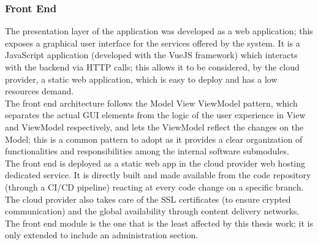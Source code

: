   \subsubsection{Front End}
  \label{ssse:originalfrontend}
    The presentation layer of the application was developed as a web application; this exposes a graphical user interface for the services offered by the system. It is a JavaScript application (developed with the VueJS framework) which interacts with the backend via HTTP calls; this allows it to be considered, by the cloud provider, a static web application, which is easy to deploy and has a low resources demand.\\
    The front end architecture follows the Model View ViewModel pattern, which separates the actual GUI elements from the logic of the user experience in View and ViewModel respectively, and lets the ViewModel reflect the changes on the Model; this is a common pattern to adopt as it provides a clear organization of functionalities and responsibilities among the internal software submodules.\\
    The front end is deployed as a static web app in the cloud provider web hosting dedicated service. It is directly built and made available from the code repository (through a CI/CD pipeline) reacting at every code change on a specific branch. The cloud provider also takes care of the SSL certificates (to ensure crypted communication) and the global availability through content delivery networks.\\
    The front end module is the one that is the least affected by this thesis work; it is only extended to include an administration section.

